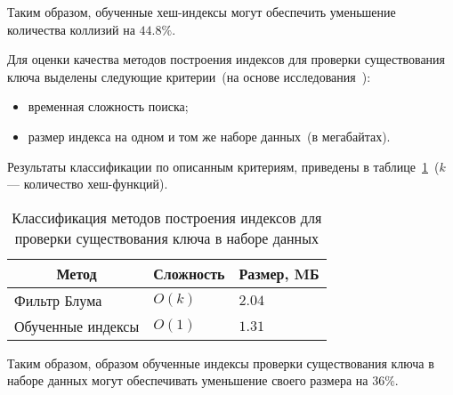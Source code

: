 Таким образом, обученные хеш-индексы могут обеспечить уменьшение количества
коллизий на $44.8\%$.

Для оценки качества методов построения индексов для проверки существования ключа
выделены следующие критерии~(на основе исследования~\cite{main}):
\begin{itemize}
    \item временная сложность поиска;
    \item размер индекса на одном и том же наборе данных~(в мегабайтах).
\end{itemize}

Результаты классификации по описанным критериям, приведены в
таблице~\ref{tab:04}~($k$ --- количество хеш-функций).

{
\captionsetup{format=hang,justification=raggedleft,
              singlelinecheck=off,width=12cm}
\begin{longtable}[Hc]{|p{5.3cm}|p{2cm}|p{2cm}|}
\caption{Классификация методов построения индексов для проверки существования
ключа в наборе данных\label{tab:04}}\\
    \hline
    \multicolumn{1}{|c|}{\textbf{Метод}} &
    \multicolumn{1}{c|}{\textbf{Сложность}} &
    \multicolumn{1}{c|}{\textbf{Размер, MБ}}\\
    \hline
    Фильтр Блума
    & $O(k)$
    & $2.04$\\
    \hline
    Обученные индексы
    & $O(1)$
    & $1.31$\\
    \hline
\end{longtable}
}

Таким образом, образом обученные индексы проверки существования ключа в наборе
данных могут обеспечивать уменьшение своего размера на $36\%$.

%
